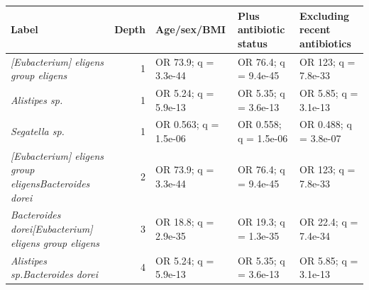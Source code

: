 \begin{center}
\scriptsize
\begin{tabularx}{\textwidth}{@{} Y r Y Y Y @{}}
\toprule
Label & Depth & Age/sex/BMI & Plus antibiotic status & Excluding recent antibiotics
 \\
\midrule
\emph{[Eubacterium] eligens group eligens} & 1 & OR 73.9; q = 3.3e-44 & OR 76.4; q = 9.4e-45 & OR 123; q = 7.8e-33 \\
\emph{Alistipes sp.} & 1 & OR 5.24; q = 5.9e-13 & OR 5.35; q = 3.6e-13 & OR 5.85; q = 3.1e-13 \\
\emph{Segatella sp.} & 1 & OR 0.563; q = 1.5e-06 & OR 0.558; q = 1.5e-06 & OR 0.488; q = 3.8e-07 \\
\emph{[Eubacterium] eligens group eligens}\dcstsep \emph{Bacteroides dorei} & 2 & OR 73.9; q = 3.3e-44 & OR 76.4; q = 9.4e-45 & OR 123; q = 7.8e-33 \\
\emph{Bacteroides dorei}\dcstsep \emph{[Eubacterium] eligens group eligens} & 3 & OR 18.8; q = 2.9e-35 & OR 19.3; q = 1.3e-35 & OR 22.4; q = 7.4e-34 \\
\emph{Alistipes sp.}\dcstsep \emph{Bacteroides dorei} & 4 & OR 5.24; q = 5.9e-13 & OR 5.35; q = 3.6e-13 & OR 5.85; q = 3.1e-13 \\
\bottomrule
\end{tabularx}
\end{center}
